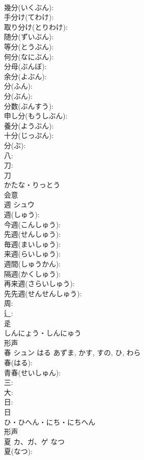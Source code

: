 \documentclass[8pt]{extreport}
\begin{document}
\begin{CJK}{UTF8}{min}
\\	幾分(いくぶん): 
\\	手分け(てわけ): 
\\	取り分け(とりわけ): 
\\	随分(ずいぶん): 
\\	等分(とうぶん): 
\\	何分(なにぶん): 
\\	分母(ぶんぼ): 
\\	余分(よぶん): 
\\	分(ふん): 
\\	分(ぶん): 
\\	分数(ぶんすう): 
\\	申し分(もうしぶん): 
\\	養分(ようぶん): 
\\	十分(じっぷん): 
\\	分(ぶ): 
\\	八: 
\\	刀: 
\\	刀	
\\	かたな・りっとう	
\\	会意 
\\	週	シュウ			
\\	週(しゅう): 
\\	今週(こんしゅう): 
\\	先週(せんしゅう): 
\\	毎週(まいしゅう): 
\\	来週(らいしゅう): 
\\	週間(しゅうかん): 
\\	隔週(かくしゅう): 
\\	再来週(さらいしゅう): 
\\	先先週(せんせんしゅう): 
\\	周: 
\\	辶: 
\\	辵	
\\	しんにょう・しんにゅう	
\\	形声 
\\	春	シュン	はる	あずま, かす, すの, ひ, わら	
\\	春(はる): 
\\	青春(せいしゅん): 
\\	三: 
\\	大: 
\\	日: 
\\	日	
\\	ひ・ひへん・にち・にちへん	
\\	形声 
\\	夏	カ、ガ、ゲ	なつ		
\\	夏(なつ): 

\end{CJK}
\end{document}

